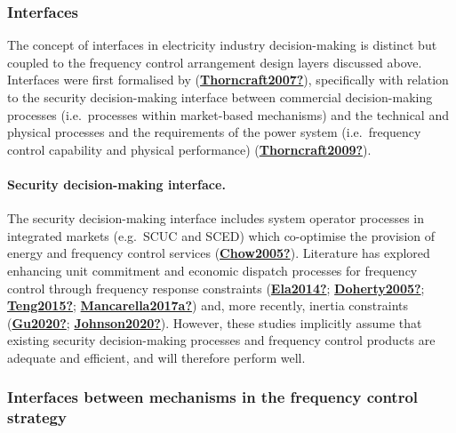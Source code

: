 \documentclass[12pt,a4paper,]{report}
\begin{document}
\hypertarget{interfaces}{%
\subsubsection{Interfaces}\label{interfaces}}

The concept of interfaces in electricity industry decision-making is
distinct but coupled to the frequency control arrangement design layers
discussed above. Interfaces were first formalised by
(\protect\hyperlink{ref-Thorncraft2007}{\textbf{Thorncraft2007?}}),
specifically with relation to the security decision-making interface
between commercial decision-making processes (i.e.~processes within
market-based mechanisms) and the technical and physical processes and
the requirements of the power system (i.e.~frequency control capability
and physical performance)
(\protect\hyperlink{ref-Thorncraft2009}{\textbf{Thorncraft2009?}}).

\hypertarget{security-decision-making-interface.}{%
\paragraph{Security decision-making
interface.}\label{security-decision-making-interface.}}

The security decision-making interface includes system operator
processes in integrated markets (e.g.~SCUC and SCED) which co-optimise
the provision of energy and frequency control services
(\protect\hyperlink{ref-Chow2005}{\textbf{Chow2005?}}). Literature has
explored enhancing unit commitment and economic dispatch processes for
frequency control through frequency response constraints
(\protect\hyperlink{ref-Ela2014}{\textbf{Ela2014?}};
\protect\hyperlink{ref-Doherty2005}{\textbf{Doherty2005?}};
\protect\hyperlink{ref-Teng2015}{\textbf{Teng2015?}};
\protect\hyperlink{ref-Mancarella2017a}{\textbf{Mancarella2017a?}}) and,
more recently, inertia constraints
(\protect\hyperlink{ref-Gu2020}{\textbf{Gu2020?}};
\protect\hyperlink{ref-Johnson2020}{\textbf{Johnson2020?}}). However,
these studies implicitly assume that existing security decision-making
processes and frequency control products are adequate and efficient, and
will therefore perform well.

\hypertarget{interfaces-between-mechanisms-in-the-frequency-control-strategy}{%
\subsubsection{Interfaces between mechanisms in the frequency control
strategy}\label{interfaces-between-mechanisms-in-the-frequency-control-strategy}}
\end{document}
